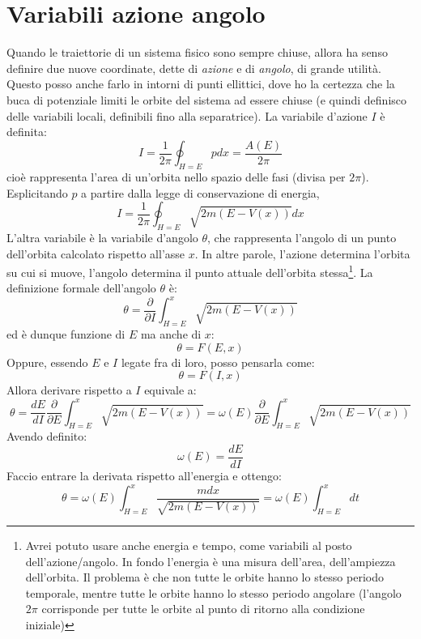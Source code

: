 \documentclass[a4paper,openany]{article}
\begin{document}
	\section{Variabili azione angolo}
	Quando le traiettorie di un sistema fisico sono sempre chiuse, allora ha senso definire due nuove coordinate, dette di \textit{azione} e di \textit{angolo}, di grande utilità. Questo posso anche farlo in intorni di punti ellittici, dove ho la certezza che la buca di potenziale limiti le orbite del sistema ad essere chiuse (e quindi definisco delle variabili locali, definibili fino alla separatrice). 
	La variabile d'azione $I$ è definita:
	\begin{equation}\label{key}
		I = \dfrac{1}{2\pi} \oint_{H=E} p dx = \dfrac{A(E)}{2\pi}
	\end{equation}
	cioè rappresenta l'area di un'orbita nello spazio delle fasi (divisa per $2\pi$). Esplicitando $p$ a partire dalla legge di conservazione di energia,
	\begin{equation}\label{key}
		I = \dfrac{1}{2\pi} \oint_{H=E} \sqrt{2m(E-V(x))} dx 
	\end{equation}
	L'altra variabile è la variabile d'angolo $\theta$, che rappresenta l'angolo di un punto dell'orbita calcolato rispetto all'asse $x$. In altre parole, l'azione determina l'orbita su cui si muove, l'angolo determina il punto attuale dell'orbita stessa\footnote{Avrei potuto usare anche energia e tempo, come variabili al posto dell'azione/angolo. In fondo l'energia è una misura dell'area, dell'ampiezza dell'orbita. Il problema è che non tutte le orbite hanno lo stesso periodo temporale, mentre tutte le orbite hanno lo stesso periodo angolare (l'angolo $2\pi$ corrisponde per tutte le orbite al punto di ritorno alla condizione iniziale)}. La definizione formale dell'angolo $\theta$ è:
	\begin{equation}\label{key}
		\theta = \dfrac{\partial}{\partial I}\int_{H=E}^{x} \sqrt{2m(E-V(x))}
	\end{equation}
	ed è dunque funzione di $E$ ma anche di $x$:
	$$
	\theta = F(E,x)
	$$
	Oppure, essendo $E$ e $I$ legate fra di loro, posso pensarla come:
	$$
	\theta = F(I,x)
	$$
	Allora derivare rispetto a $I$ equivale a:
	$$
	\theta = \dfrac{dE}{dI}\dfrac{\partial}{\partial E} \int_{H=E}^{x} \sqrt{2m(E-V(x))} = \omega(E)\dfrac{\partial}{\partial E} \int_{H=E}^{x} \sqrt{2m(E-V(x))}
	$$
	Avendo definito:
	$$
	\omega(E) = \dfrac{dE}{dI}
	$$
	Faccio entrare la derivata rispetto all'energia e ottengo:
	$$
	\theta = \omega(E)\int_{H=E}^{x} \dfrac{mdx}{\sqrt{2m(E-V(x))}} = \omega(E) \int_{H=E}^{x}dt
	$$
\end{document}
